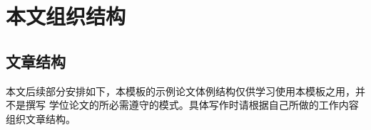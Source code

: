 \section{本文组织结构}
\label{sec:organization}

\subsection{文章结构}
\label{sec:suborganization}

本文后续部分安排如下，本模板的示例论文体例结构仅供学习使用本模板之用，并不是撰写
学位论文的所必需遵守的模式。具体写作时请根据自己所做的工作内容组织文章结构。


